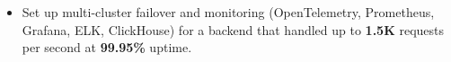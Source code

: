 
\projDattingQ
\begin{itemize}
    \item Set up multi-cluster failover and monitoring (OpenTelemetry, Prometheus, Grafana, ELK, ClickHouse) for a backend that handled up to \textbf{1.5K} requests per second at \textbf{99.95\%} uptime. %
\end{itemize}

\cveducation


